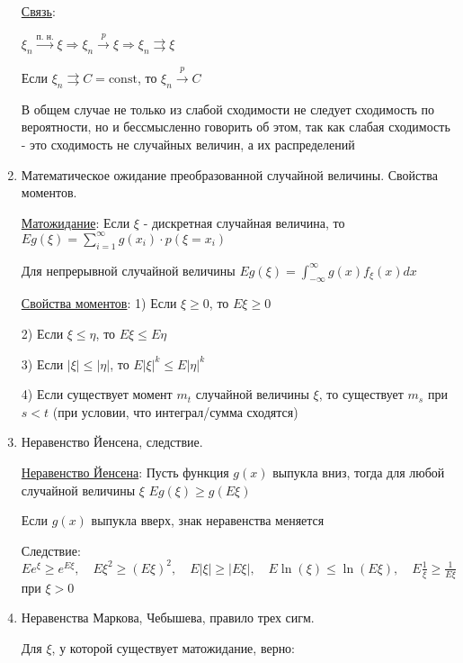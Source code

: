 \begin{enumerate}
    \hyperlink{connectionbetweenconvergencetypes}{Связь}: 

    \Ths $\xi_n \overset{\text{п. н.}}{\longrightarrow} \xi \Longrightarrow \xi_n \overset{p}{\longrightarrow} \xi \Longrightarrow \xi_n \rightrightarrows \xi$

    \Ths Если $\xi_n \rightrightarrows C = \mathrm{const}$, то $\xi_n \overset{p}{\longrightarrow} C$

    \Nota В общем случае не только из слабой сходимости не следует сходимость по вероятности, но и бессмысленно говорить
    об этом, так как слабая сходимость - это сходимость не случайных величин, а их распределений

    \item Математическое ожидание преобразованной случайной величины. Свойства моментов.
    
    \hyperlink{expectedvalueoftransformedvariable}{Матожидание}: \Ths Если $\xi$ - дискретная случайная величина, то $Eg(\xi) = \sum_{i = 1}^\infty g(x_i) \cdot p(\xi = x_i)$

    Для непрерывной случайной величины $Eg(\xi) = \int_{-\infty}^{\infty} g(x) f_\xi(x) dx$

    \hyperlink{momentsproperties}{Свойства моментов}: 1) Если $\xi \geq 0$, то $E\xi \geq 0$

    2) Если $\xi \leq \eta$, то $E\xi \leq E\eta$

    3) Если $|\xi| \leq |\eta|$, то $E|\xi|^k \leq E|\eta|^k$

    4) Если существует момент $m_t$ случайной величины $\xi$, то существует $m_s$ при $s < t$ (при условии, что интеграл/сумма сходятся)

    
    \item Неравенство Йенсена, следствие.

    \hyperlink{jensensinequality}{Неравенство Йенсена}: \Ths Пусть функция $g(x)$ выпукла вниз, тогда для любой случайной величины $\xi$ $Eg(\xi) \geq g(E\xi)$

    \Nota Если $g(x)$ выпукла вверх, знак неравенства меняется

    Следствие: $Ee^\xi \geq e^{E\xi}, \quad E\xi^2 \geq (E\xi)^2, \quad E|\xi| \geq |E\xi|, \quad E\ln(\xi) \leq \ln(E\xi), \quad E\frac{1}{\xi} \geq \frac{1}{E\xi}$ при $\xi > 0$

    \item Неравенства Маркова, Чебышева, правило трех сигм.

    Для $\xi$, у которой существует матожидание, верно: 


\end{enumerate}
